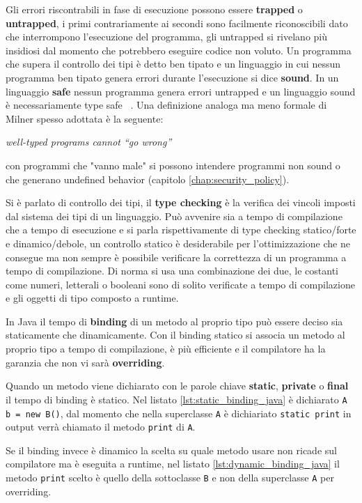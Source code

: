 \documentclass[Lau,binding=0.6cm]{sapthesis}
\newcommand{\textcode}[1]{\colorbox{backcolour}{\texttt{#1}}}
\begin{document}
Gli errori riscontrabili in fase di esecuzione possono essere \textbf{trapped} o \textbf{untrapped}, i primi contrariamente ai secondi sono facilmente riconoscibili dato che interrompono l'esecuzione del programma, gli untrapped si rivelano più insidiosi dal momento che potrebbero eseguire codice non voluto.
Un programma che supera il controllo dei tipi è detto ben tipato e un linguaggio in cui nessun programma ben tipato genera errori durante l'esecuzione si dice \textbf{sound}.
In un linguaggio \textbf{safe} nessun programma genera errori untrapped e un linguaggio sound è necessariamente type safe ~\cite{cencia:dispense}.
Una definizione analoga ma meno formale di Milner spesso adottata è la seguente:

\begin{center}
   \textit{well-typed programs cannot “go wrong”} ~\cite{milner:type_polymorphism}
\end{center}

con programmi che "vanno male" si possono intendere programmi non sound o che generano undefined behavior (capitolo \ref{chap:security_policy}).

Si è parlato di controllo dei tipi, il \textbf{type checking} è la verifica dei vincoli imposti dal sistema dei tipi di un linguaggio.
Può avvenire sia a tempo di compilazione che a tempo di esecuzione e si parla rispettivamente di type checking statico/forte e dinamico/debole, un controllo statico è desiderabile per l'ottimizzazione che ne consegue ma non sempre è possibile verificare la correttezza di un programma a tempo di compilazione.
Di norma si usa una combinazione dei due, le costanti come numeri, letterali o booleani sono di solito verificate a tempo di compilazione e gli oggetti di tipo composto a runtime. 

In Java il tempo di \textbf{binding} di un metodo al proprio tipo può essere deciso sia staticamente che dinamicamente.
Con il binding statico si associa un metodo al proprio tipo a tempo di compilazione, è più efficiente e il compilatore ha la garanzia che non vi sarà \textbf{overriding}. 

Quando un metodo viene dichiarato con le parole chiave \textbf{static}, \textbf{private} o \textbf{final} il tempo di binding è statico.
Nel listato \ref{lst:static_binding_java} è dichiarato \textcode{A b = new B()}, dal momento che nella superclasse \textcode{A} è dichiariato \textcode{static print} in output verrà chiamato il metodo \textcode{print} di \textcode{A}.

Se il binding invece è dinamico la scelta su quale metodo usare non ricade sul compilatore ma è eseguita a runtime, nel listato \ref{lst:dynamic_binding_java} il metodo \textcode{print} scelto è quello della sottoclasse \textcode{B} e non della superclasse \textcode{A} per overriding.
\end{document}
